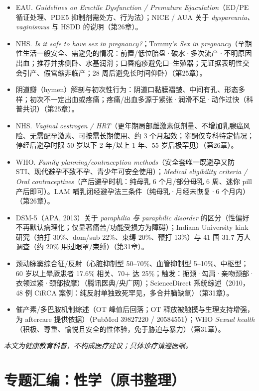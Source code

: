 \documentclass[12pt,UTF8,openany]{ctexbook}
\begin{document}
\begin{itemize}[leftmargin=2em]
  \item EAU. \emph{Guidelines on Erectile Dysfunction / Premature Ejaculation}（ED/PE 循证处理、PDE5 抑制剂需处方、行为法）；NICE / AUA 关于 \emph{dyspareunia、vaginismus} 与 HSDD 的说明（第26章）。
  \item NHS. \emph{Is it safe to have sex in pregnancy?}；Tommy's \emph{Sex in pregnancy}（孕期性生活一般安全、需避免的情况：前置/低位胎盘·破水·多次流产·不明原因出血；推荐并排侧卧、水基润滑；口唇疱疹避免口--生殖器；无证据表明性交会引产、假宫缩非临产；28 周后避免长时间仰卧）（第25章）。
  \item 阴道瓣（hymen）解剖与初次性行为：阴道口黏膜褶皱、中间有孔、形态多样；初次不一定出血或疼痛；疼痛/出血多源于紧张·润滑不足·动作过快（科普共识）（第25章）。
  \item NHS. \emph{Vaginal oestrogen / HRT}（更年期局部雌激素低剂量、不增加乳腺癌风险、无需配孕激素、可按需长期使用、约 3 个月起效；睾酮仅专科特定情况；停经后避孕时限 50 岁以下 2 年/以上 1 年、55 岁后极罕见）（第26章）。
  \item WHO. \emph{Family planning/contraception methods}（安全套唯一既避孕又防 STI、现代避孕不致不孕、青少年可安全使用）；\emph{Medical eligibility criteria / Oral contraceptives}（产后避孕时机：纯母乳 6 个月/部分母乳 6 周、迷你 pill 产后即可）。LAM 哺乳闭经避孕法三条件（纯母乳·月经未恢复·6 个月内）（第26章）。
  \item DSM-5（APA, 2013）关于 \emph{paraphilia 与 paraphilic disorder} 的区分（性偏好不再默认病理化；仅显著痛苦/功能受损方为障碍）；Indiana University kink 研究（拍打 30\%、dom/sub 22\%、束缚 20\%、鞭打 13\%）与 41 国 31.7 万人调查（约 20\% 用过眼罩/束缚）（第31章）。
  \item 颈动脉窦综合征/反射（心脏抑制型 50--70\%、血管抑制型 5--10\%、中枢型；60 岁以上晕厥患者 17.6\% 相关、70+ 达 25\%；触发：扼颈·勾肩·亲吻颈部·衣领过紧·颈部按摩）（腾讯医典/央广网）；ScienceDirect 系统综述（2010，48 例 CiRCA 案例：纯反射单独致死罕见，多合并脑缺氧）（第31章）。
  \item 催产素/多巴胺机制综述（OT 峰值后回落；OT 释放被触摸与生理支持增强，为 aftercare 提供依据）（PubMed 39827220 / 20584551）；WHO \emph{Sexual health}（积极、尊重、愉悦且安全的性体验，免于胁迫与暴力）（第31章）。
\end{itemize}

\begin{center}
\itshape 本文为健康教育科普，不构成医疗建议；具体诊疗请遵医嘱。
\end{center}

\clearpage
\part{专题汇编：性学（原书整理）}
\end{document}
